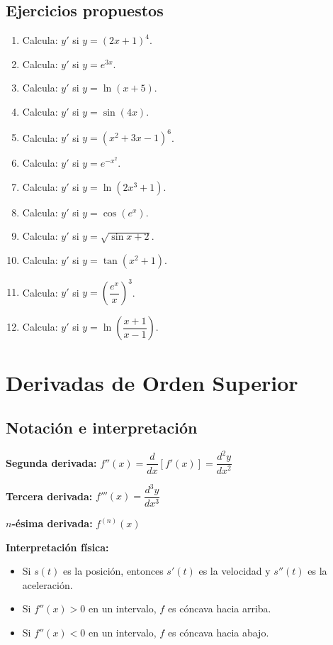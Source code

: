 \documentclass[12pt, letterpaper]{article}
\begin{document}
\subsection{Ejercicios propuestos}

\begin{enumerate}[series=ejercicios, leftmargin=*]
  \item \facil{} Calcula: $y'$ si $y = (2x + 1)^4$.
  \item \facil{} Calcula: $y'$ si $y = e^{3x}$.
  \item \facil{} Calcula: $y'$ si $y = \ln(x + 5)$.
  \item \facil{} Calcula: $y'$ si $y = \sin(4x)$.
  \item \medio{} Calcula: $y'$ si $y = (x^2 + 3x - 1)^6$.
  \item \medio{} Calcula: $y'$ si $y = e^{-x^2}$.
  \item \medio{} Calcula: $y'$ si $y = \ln(2x^3 + 1)$.
  \item \medio{} Calcula: $y'$ si $y = \cos(e^x)$.
  \item \dificil{} Calcula: $y'$ si $y = \sqrt{\sin x + 2}$.
  \item \dificil{} Calcula: $y'$ si $y = \tan(x^2 + 1)$.
  \item \dificil{} Calcula: $y'$ si $y = \left(\dfrac{e^x}{x}\right)^3$.
  \item \dificil{} Calcula: $y'$ si $y = \ln\left(\dfrac{x + 1}{x - 1}\right)$.
\end{enumerate}

\newpage


\section{Derivadas de Orden Superior}

\subsection{Notación e interpretación}

\begin{cuadroteoria}
  \textbf{Segunda derivada:} $f''(x) = \dfrac{d}{dx}[f'(x)] = \dfrac{d^2y}{dx^2}$

  \textbf{Tercera derivada:} $f'''(x) = \dfrac{d^3y}{dx^3}$

  \textbf{$n$-ésima derivada:} $f^{(n)}(x)$

  \textbf{Interpretación física:}
  \begin{itemize}[leftmargin=*]
    \item Si $s(t)$ es la posición, entonces $s'(t)$ es la velocidad y $s''(t)$ es la aceleración.
    \item Si $f''(x) > 0$ en un intervalo, $f$ es cóncava hacia arriba.
    \item Si $f''(x) < 0$ en un intervalo, $f$ es cóncava hacia abajo.
  \end{itemize}
\end{cuadroteoria}
\end{document}
